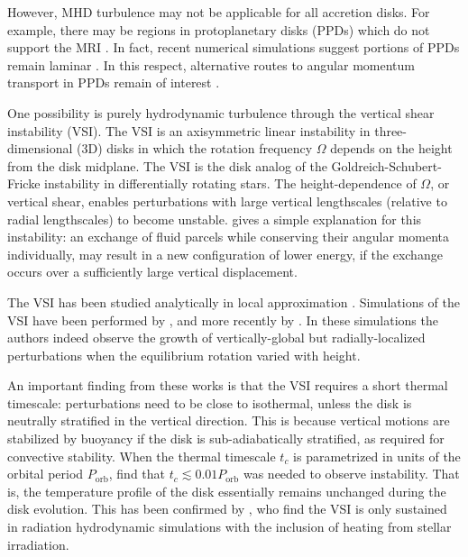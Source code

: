 \documentclass[iop]{emulateapj}
\begin{document}
However, MHD turbulence may not be applicable for all  
accretion disks. For example, there may be regions in protoplanetary  
disks (PPDs) which do not support the MRI 
\citep{gammie96,landry13}. In fact, recent  numerical simulations
suggest portions of PPDs remain laminar \citep[e.g.][and references
therein]{lesur14,bai15,gressel15}. In this respect, alternative routes 
to angular momentum transport in PPDs remain of interest
\citep{armitage10}. 
 
One possibility is purely hydrodynamic turbulence through the vertical
shear instability (VSI). The VSI is an axisymmetric linear instability
in three-dimensional (3D) disks in which the rotation frequency
$\Omega$ depends on the height from the disk midplane. The VSI is the
disk analog of the Goldreich-Schubert-Fricke instability
\citep[GSF,][]{goldreich67,fricke68} in differentially rotating stars.   
The height-dependence of $\Omega$, or vertical shear, enables
perturbations with large vertical lengthscales (relative to radial
lengthscales) to become unstable.    
\cite{umurhan13} gives a simple explanation for this 
instability: an exchange of fluid parcels while conserving their
angular momenta individually, may result in a new configuration of
lower energy, if the exchange occurs over a sufficiently large
vertical displacement.  


The VSI has been studied analytically in local approximation
\citep{urpin98,urpin03}. Simulations of the  
VSI have been performed by \cite{arlt04}, and more recently by 
\cite{nelson13}. In these simulations the authors indeed observe the
growth of vertically-global but radially-localized perturbations when
the equilibrium rotation varied with height.  

An important finding from these works is that the VSI requires a short
thermal timescale: perturbations need to be close to
isothermal, unless the disk is neutrally stratified in the vertical
direction. This is because vertical motions are stabilized by
buoyancy if the disk is sub-adiabatically stratified, as required for
convective stability. When the thermal timescale $t_c$ is parametrized
in units of the orbital period $P_\mathrm{orb}$, \cite{nelson13} find that
$t_c\lesssim 0.01P_\mathrm{orb}$ was needed to observe instability. That is, the
temperature profile of the disk essentially remains unchanged during
the disk evolution. This has been confirmed by 
\cite{stoll14}, who find the 
VSI is only sustained in radiation hydrodynamic simulations 
with the inclusion of heating from stellar irradiation.    
\end{document}
